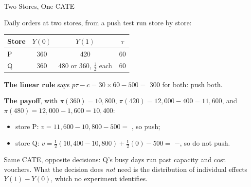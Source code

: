 \documentclass[aspectratio=169, 11pt, handout]{beamer}
\begin{document}
\begin{frame}{Two Stores, One CATE}

Daily orders at two stores, from a push test run store by store:

\begin{center}
\small
\begin{tabular}{lccc}
\toprule
\textbf{Store} & $Y(0)$ & $Y(1)$ & $\tau$ \\
\midrule
P & 360 & 420 & 60 \\
Q & 360 & 480 or 360, $\tfrac12$ each & 60 \\
\bottomrule
\end{tabular}
\end{center}

\textbf{The linear rule} says $p\tau - c = 30 \times 60 - 500 = $ 300 for both: push both.

\medskip

\textbf{The payoff}, with $\pi(360) = 10{,}800$, $\pi(420) = 12{,}000 - 400 = 11{,}600$, and $\pi(480) = 12{,}000 - 1{,}600 = 10{,}400$:
\begin{itemize}
  \item store P: $v = 11{,}600 - 10{,}800 - 500 = $ \textcolor{sbgreen}{}, so push;
  \item store Q: $v = \tfrac12(10{,}400 - 10{,}800) + \tfrac12(0) - 500 = $ \textcolor{warnred}{$-$}, so do not push.
\end{itemize}

\medskip

Same CATE, opposite decisions: Q's busy days run past capacity and cost vouchers. What the decision does \emph{not} need is the distribution of individual effects $Y(1) - Y(0)$, which no experiment identifies.
\end{frame}
\end{document}
